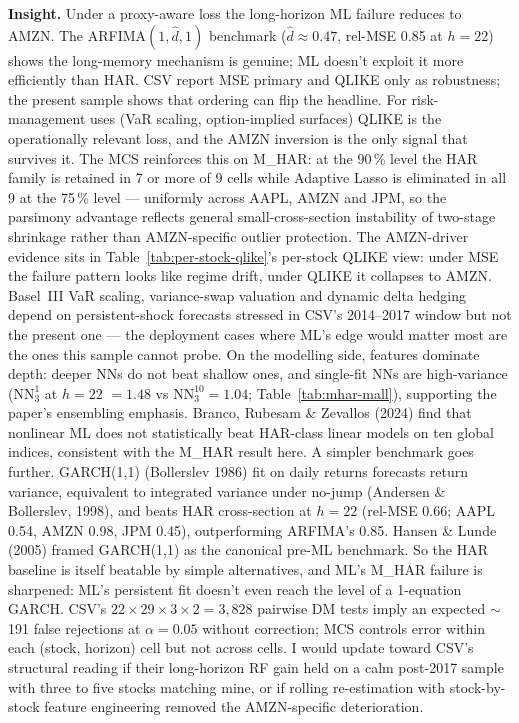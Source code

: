 \documentclass[twocolumn,9pt]{extarticle}
\newcommand{\lead}[1]{\textbf{#1}\hspace{0.25em}\ignorespaces}
\begin{document}
\lead{Insight.} Under a proxy-aware loss the long-horizon ML
failure reduces to AMZN. The ARFIMA$(1,\hat{d},1)$ benchmark
($\hat{d}\approx0.47$, rel-MSE 0.85 at $h=22$) shows the
long-memory mechanism is genuine; ML doesn't exploit it more
efficiently than HAR. CSV report MSE primary and QLIKE only as
robustness; the present sample shows that ordering can flip the
headline. For risk-management uses (VaR scaling, option-implied
surfaces) QLIKE is the operationally relevant loss, and the AMZN
inversion is the only signal that survives it. The MCS reinforces
this on M\_HAR: at the 90\,\% level the HAR family is retained in 7
or more of 9 cells while Adaptive Lasso is eliminated in all 9 at
the 75\,\% level --- uniformly across AAPL, AMZN and JPM, so the
parsimony advantage reflects general small-cross-section
instability of two-stage shrinkage rather than AMZN-specific
outlier protection. The AMZN-driver evidence sits in Table~\ref{tab:per-stock-qlike}'s
per-stock QLIKE view: under MSE the failure pattern looks like
regime drift, under QLIKE it collapses to AMZN. Basel~III VaR
scaling, variance-swap valuation and dynamic delta hedging depend on
persistent-shock forecasts stressed in CSV's 2014--2017 window but
not the present one --- the deployment cases where ML's edge would
matter most are the ones this sample cannot probe. On the modelling
side, features dominate depth: deeper NNs do not beat shallow ones,
and single-fit NNs are high-variance ($\mathrm{NN}_3^{1}$ at $h=22$
$=1.48$ vs $\mathrm{NN}_3^{10}=1.04$; Table~\ref{tab:mhar-mall}), supporting the
paper's ensembling emphasis. Branco, Rubesam \& Zevallos (2024) find
that nonlinear ML does not statistically beat HAR-class linear
models on ten global indices, consistent with the M\_HAR result
here. A simpler benchmark goes further. GARCH(1,1) (Bollerslev 1986)
fit on daily returns forecasts return variance, equivalent to
integrated variance under no-jump (Andersen \& Bollerslev, 1998),
and beats HAR cross-section at $h=22$ (rel-MSE 0.66; AAPL 0.54,
AMZN 0.98, JPM 0.45), outperforming ARFIMA's 0.85. Hansen \& Lunde
(2005) framed GARCH(1,1) as the canonical pre-ML benchmark. So the
HAR baseline is itself beatable by simple alternatives, and ML's
M\_HAR failure is sharpened: ML's persistent fit doesn't even reach
the level of a 1-equation GARCH. CSV's
$22\times29\times3\times2=3{,}828$ pairwise DM tests imply an
expected $\sim$191 false rejections at $\alpha=0.05$ without
correction; MCS controls error within each (stock, horizon) cell but
not across cells. I would update toward CSV's structural reading if
their long-horizon RF gain held on a calm post-2017 sample with
three to five stocks matching mine, or if rolling re-estimation with
stock-by-stock feature engineering removed the AMZN-specific
deterioration.
\end{document}
